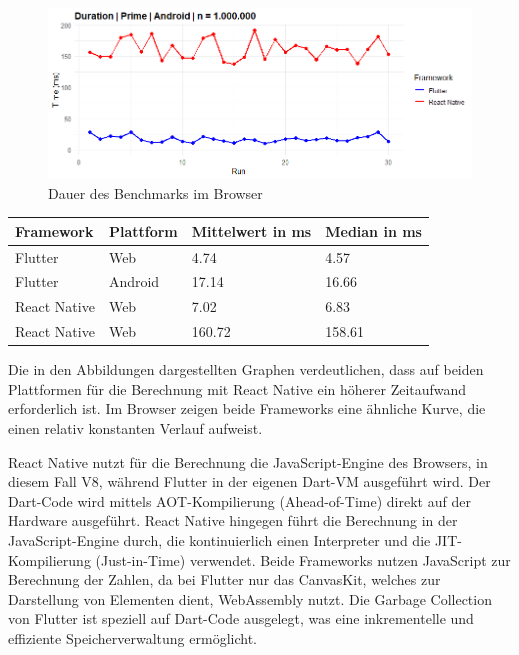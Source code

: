 \begin{figure}[H]
    \centering
    \includegraphics[width=1\linewidth]{images/android/Prime.png}
    \caption{Dauer des Benchmarks im Browser}
\end{figure}

\begin{table}[h!]
    \centering
    \begin{tabular}{llll}
    \toprule
    \textbf{Framework} & \textbf{Plattform} & \textbf{Mittelwert in ms} & \textbf{Median in ms} \\
    \midrule
        Flutter & Web & 4.74 & 4.57 \\
        Flutter & Android & 17.14 & 16.66 \\
        React Native & Web & 7.02 & 6.83 \\
        React Native & Web & 160.72 & 158.61 \\
    \bottomrule
    \end{tabular}
\end{table}

Die in den Abbildungen dargestellten Graphen verdeutlichen, dass auf beiden Plattformen für die Berechnung mit React Native ein höherer Zeitaufwand erforderlich ist. Im Browser zeigen beide Frameworks eine ähnliche Kurve, die einen relativ konstanten Verlauf aufweist.

React Native nutzt für die Berechnung die JavaScript-Engine des Browsers, in diesem Fall V8, während Flutter in der eigenen Dart-VM ausgeführt wird. Der Dart-Code wird mittels AOT-Kompilierung (Ahead-of-Time) direkt auf der Hardware ausgeführt. React Native hingegen führt die Berechnung in der JavaScript-Engine durch, die kontinuierlich einen Interpreter und die JIT-Kompilierung (Just-in-Time) verwendet. Beide Frameworks nutzen JavaScript zur Berechnung der Zahlen, da bei Flutter nur das CanvasKit, welches zur Darstellung von Elementen dient, WebAssembly nutzt.
Die Garbage Collection von Flutter ist speziell auf Dart-Code ausgelegt, was eine inkrementelle und effiziente Speicherverwaltung ermöglicht.

